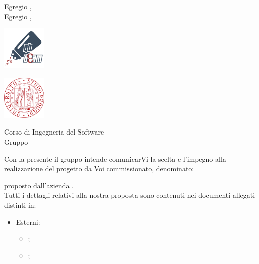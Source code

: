 \documentclass[12pt]{letter}
\begin{document}
    \begin{letter}
        { Egregio \VT{},\\Egregio \CR{},}
        \begin{minipage}{.5\textwidth}
            \begin{flushleft}
                \includegraphics[width=.4\linewidth, height=80px]{../Utilita/Immagini/qbteam.png}
            \end{flushleft}
        \end{minipage}
        \begin{minipage}{.5\textwidth}
            \begin{flushright}
                \includegraphics[width=.4\linewidth, height=80px]{../Utilita/Immagini/LogoUniPD.png}
            \end{flushright}
        \end{minipage}
        {    
        \begin{flushleft}
            Corso di Ingegneria del Software\\ Gruppo \Gruppo{}\\ 
        \end{flushleft}
        }
        \opening{ Con la presente il gruppo \Gruppo{} intende comunicarVi la scelta e l'impegno alla realizzazione del progetto da Voi commissionato, denominato:}
        \begin{center}
           \textbf{\NomeProgetto{}} 
        \end{center}
        proposto dall'azienda \textbf{\Proponente{}}.\\
        Tutti i dettagli relativi alla nostra proposta sono contenuti nei documenti allegati distinti in: \\
        \begin{itemize}
        \item Esterni:
        \begin{itemize}
            \item {};
            \item {};

\end{itemize}
\end{itemize}
\end{letter}
\end{document}
